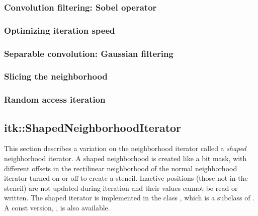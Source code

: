 {\subsubsection{Convolution filtering: Sobel operator}
\label{sec:NeighborhoodExample2}


\subsubsection{Optimizing iteration speed}
\label{sec:NeighborhoodExample3}


\subsubsection{Separable convolution: Gaussian filtering}
\label{sec:NeighborhoodExample4}


\subsubsection{Slicing the neighborhood}
\label{sec:NeighborhoodExample5}


\subsubsection{Random access iteration}
\label{sec:NeighborhoodExample6}




\subsection{itk::ShapedNeighborhoodIterator}
\label{sec:itkShapedNeighborhoodIterator}

This section describes a variation on the neighborhood iterator called a
\emph{shaped} neighborhood iterator.  A shaped neighborhood is created like
a bit mask, with different offsets in the rectilinear neighborhood of
the normal neighborhood iterator turned on or off to create a stencil.
Inactive positions (those not in the stencil) are not updated during iteration and
their values cannot be read or written.  The shaped iterator is implemented in
the class , which is a subclass of
.  A const version,
, is also available.

}
